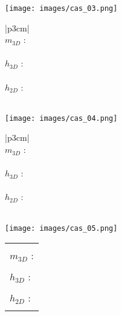 \documentclass[10pt,fleqn]{article} %
\begin{document}
\begin{multicols}{2}
\begin{minipage}[c]{.45\linewidth}
\begin{center}
\texttt{[image: images/cas\_03.png]}
\end{center}
\end{minipage} \hfill
\begin{minipage}[c]{.5\linewidth}
\begin{center}
\begin{tabular}{|p{3cm}|}
\hline 
\\
$m_{3D}$ : \\
\\
$h_{3D}$ : \\
\\
$h_{2D}$ : \\
\\
\hline
\end{tabular}
\end{center}
\end{minipage}


\begin{minipage}[c]{.45\linewidth}
\begin{center}
\texttt{[image: images/cas\_04.png]}
\end{center}
\end{minipage} \hfill
\begin{minipage}[c]{.5\linewidth}
\begin{center}
\begin{tabular}{|p{3cm}|}
\hline 
\\
$m_{3D}$ : \\
\\
$h_{3D}$ : \\
\\
$h_{2D}$ : \\
\\
\hline
\end{tabular}
\end{center}
\end{minipage}


\begin{minipage}[c]{.45\linewidth}
\begin{center}
\texttt{[image: images/cas\_05.png]}
\end{center}
\end{minipage} \hfill
\begin{minipage}[c]{.5\linewidth}
\begin{center}
\begin{tabular}{|p{3cm}|}
\hline 
\\
$m_{3D}$ : \\
\\
$h_{3D}$ : \\
\\
$h_{2D}$ : \\
\\
\hline
\end{tabular}
\end{center}
\end{minipage}



\end{multicols}
\end{document}
